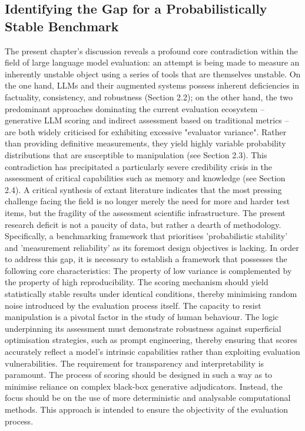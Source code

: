 \subsection{Identifying the Gap for a Probabilistically Stable Benchmark}
The present chapter's discussion reveals a profound core contradiction within the field of large language model evaluation: an attempt is being made to measure an inherently unstable object using a series of tools that are themselves unstable. On the one hand, LLMs and their augmented systems possess inherent deficiencies in factuality, consistency, and robustness (Section 2.2); on the other hand, the two predominant approaches dominating the current evaluation ecosystem – generative LLM scoring and indirect assessment based on traditional metrics – are both widely criticised for exhibiting excessive "evaluator variance". Rather than providing definitive measurements, they yield highly variable probability distributions that are susceptible to manipulation (see Section 2.3). This contradiction has precipitated a particularly severe credibility crisis in the assessment of critical capabilities such as memory and knowledge (see Section 2.4).
A critical synthesis of extant literature indicates that the most pressing challenge facing the field is no longer merely the need for more and harder test items, but the fragility of the assessment scientific infrastructure. The present research deficit is not a paucity of data, but rather a dearth of methodology. Specifically, a benchmarking framework that prioritises 'probabilistic stability' and 'measurement reliability' as its foremost design objectives is lacking. In order to address this gap, it is necessary to establish a framework that possesses the following core characteristics:
The property of low variance is complemented by the property of high reproducibility. The scoring mechanism should yield statistically stable results under identical conditions, thereby minimising random noise introduced by the evaluation process itself.
The capacity to resist manipulation is a pivotal factor in the study of human behaviour. The logic underpinning its assessment must demonstrate robustness against superficial optimisation strategies, such as prompt engineering, thereby ensuring that scores accurately reflect a model's intrinsic capabilities rather than exploiting evaluation vulnerabilities.
The requirement for transparency and interpretability is paramount. The process of scoring should be designed in such a way as to minimise reliance on complex black-box generative adjudicators. Instead, the focus should be on the use of more deterministic and analysable computational methods. This approach is intended to ensure the objectivity of the evaluation process.
